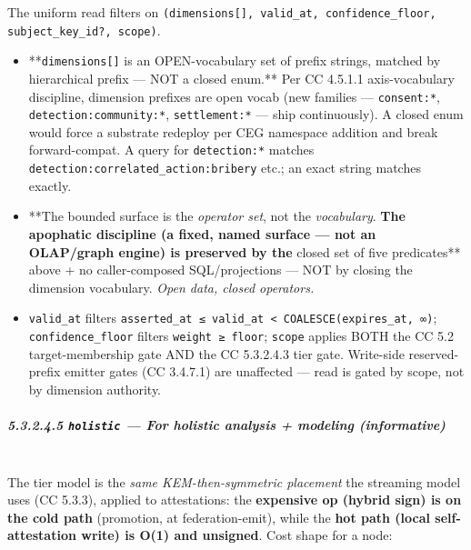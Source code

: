 \documentclass[11pt]{article}
\begin{document}
The uniform read filters on \texttt{(dimensions[], valid\_at, confidence\_floor, subject\_key\_id?, scope)}.

\begin{itemize}\setlength\itemsep{0pt}
\item **\texttt{dimensions[]} is an OPEN-vocabulary set of prefix strings, matched by hierarchical prefix — NOT a closed enum.** Per CC 4.5.1.1 axis-vocabulary discipline, dimension prefixes are open vocab (new families — \texttt{consent:*}, \texttt{detection:community:*}, \texttt{settlement:*} — ship continuously). A closed enum would force a substrate redeploy per CEG namespace addition and break forward-compat. A query for \texttt{detection:*} matches \texttt{detection:correlated\_action:bribery} etc.; an exact string matches exactly.
\item **The bounded surface is the \textit{operator set}, not the \textit{vocabulary}.\textbf{ The apophatic discipline (a fixed, named surface — not an OLAP/graph engine) is preserved by the }closed set of five predicates** above + no caller-composed SQL/projections — NOT by closing the dimension vocabulary. \textit{Open data, closed operators.}
\item \texttt{valid\_at} filters \texttt{asserted\_at ≤ valid\_at < COALESCE(expires\_at, ∞)}; \texttt{confidence\_floor} filters \texttt{weight ≥ floor}; \texttt{scope} applies BOTH the CC 5.2 target-membership gate AND the CC 5.3.2.4.3 tier gate. Write-side reserved-prefix emitter gates (CC 3.4.7.1) are unaffected — read is gated by scope, not by dimension authority.
\end{itemize}


\subparagraph{5.3.2.4.5 \texttt{holistic} — For holistic analysis + modeling (informative)}\mbox{}\\


The tier model is the \textit{same KEM-then-symmetric placement} the streaming model uses (CC 5.3.3), applied to attestations: the \textbf{expensive op (hybrid sign) is on the cold path} (promotion, at federation-emit), while the \textbf{hot path (local self-attestation write) is O(1) and unsigned}. Cost shape for a node:
\end{document}
